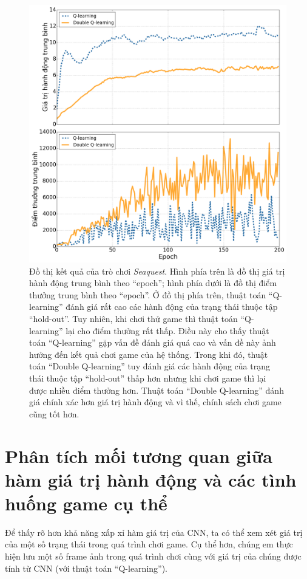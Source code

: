 	\begin{figure}
		\centering
		\includegraphics[width=\textwidth]{double_compare}
		\caption[Đồ thị giá trị hành động trung bình và điểm thưởng trung bình của hai thuật toán]{
		Đồ thị kết quả của trò chơi \textit{Seaquest}.
		Hình phía trên là đồ thị giá trị hành động trung bình theo ``epoch''; hình phía dưới là đồ thị điểm thưởng trung bình theo ``epoch''.
		Ở đồ thị phía trên, thuật toán ``Q-learning'' đánh giá rất cao các hành động của trạng thái thuộc tập ``hold-out''.
		Tuy nhiên, khi chơi thử game thì thuật toán ``Q-learning'' lại cho điểm thưởng rất thấp.
		Điều này cho thấy thuật toán ``Q-learning'' gặp vấn đề đánh giá quá cao và vấn đề này ảnh hưởng đến kết quả chơi game của hệ thống.
		Trong khi đó, thuật toán ``Double Q-learning'' tuy đánh giá các hành động của trạng thái thuộc tập ``hold-out'' thấp hơn nhưng khi chơi game thì lại được nhiều điểm thưởng hơn.
		Thuật toán ``Double Q-learning'' đánh giá chính xác hơn giá trị hành động và vì thế, chính sách chơi game cũng tốt hơn.}
		\label{fig_double_compare}
	\end{figure}
		
\section{Phân tích mối tương quan giữa hàm giá trị hành động và các tình huống game cụ thể}
	Để thấy rõ hơn khả năng xấp xỉ hàm giá trị của CNN, ta có thể xem xét giá trị của một số trạng thái trong quá trình chơi game.
	Cụ thể hơn, chúng em thực hiện lưu một số frame ảnh trong quá trình chơi cùng với giá trị của chúng được tính từ CNN (với thuật toán ``Q-learning'').
	
